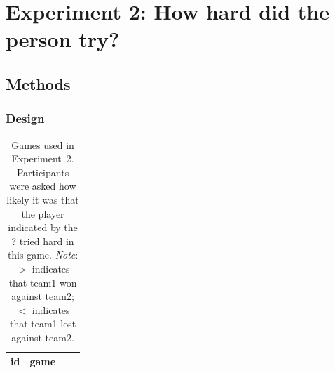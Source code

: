 \documentclass[11pt]{article}
\begin{document}
\section{Experiment 2: How hard did the person try?}
\label{sec:experiment_2_effort}

\subsection{Methods}
\label{sub:methods}

\subsubsection{Design}
\label{ssub:design}

{\setlength{\tabcolsep}{2pt} 
\begin{longtable}{cccc}

\caption{Games used in Experiment~2. Participants were asked how likely it was that the player indicated by the ? tried hard in this game. \emph{Note}: $>$ indicates that team1 won against team2; $<$ indicates that team1 lost against team2.}\\

  \toprule
 id & game \\
  \midrule
  \endfirsthead


\end{longtable}}
\end{document}
